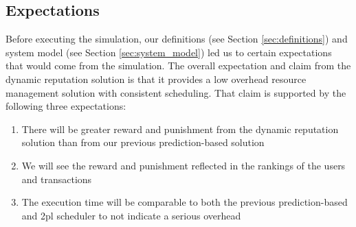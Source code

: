 \subsection{Expectations}
\label{sec:anal_expectations}

Before executing the simulation, our definitions (see Section \ref{sec:definitions}) and system model (see Section \ref{sec:system_model}) led us to certain expectations that would come from the simulation. The overall expectation and claim from the dynamic reputation solution is that it provides a low overhead resource management solution with consistent scheduling. That claim is supported by the following three expectations:

\begin{enumerate}
    \item There will be greater reward and punishment from the dynamic reputation solution than from our previous prediction-based solution
    \item We will see the reward and punishment reflected in the rankings of the users and transactions
    \item The execution time will be comparable to both the previous prediction-based and \gls{2pl} scheduler to not indicate a serious overhead
\end{enumerate}